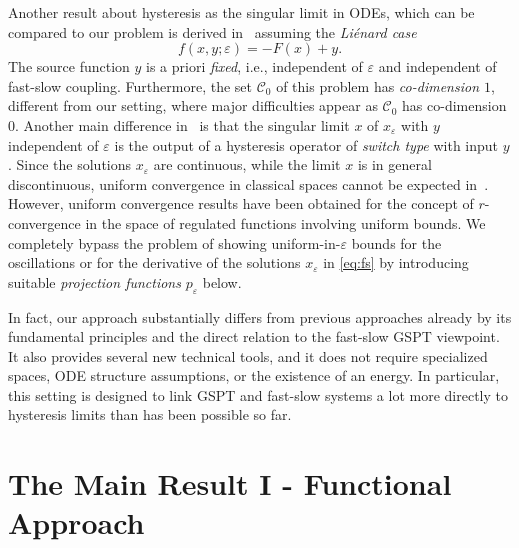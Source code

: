 \documentclass[12pt]{article}
\newcommand{\benn}{\begin{equation*}}
\newcommand{\eenn}{\end{equation*}}
\begin{document}
Another result about hysteresis as the singular limit in ODEs, which can be compared to 
our problem is derived in~\cite{Krejci2} assuming the 
\emph{Li\'enard case} 
\benn
f(x,y;\varepsilon)= -F(x)+y.
\eenn
The source function $y$ is a priori \emph{fixed}, i.e., independent of $\varepsilon$ 
and independent of fast-slow coupling. Furthermore, the set $\mathcal{C}_0$ of this 
problem has \emph{co-dimension $1$}, different from our setting, where major difficulties 
appear as $\mathcal{C}_0$ has co-dimension $0$. Another main difference in~\cite{Krejci2} 
is that the singular limit $x$ of $x_\varepsilon$ with $y$ independent of $\varepsilon$ is the 
output of a hysteresis operator of \emph{switch type} with input $y$. Since the solutions 
$x_\varepsilon$ are continuous, while the limit $x$ is in general discontinuous, uniform 
convergence in classical spaces cannot be expected 
in~\cite{Krejci2}. However, uniform
convergence results have been obtained for the concept of $r$-convergence in the space of 
regulated functions involving uniform bounds. We completely bypass the problem of showing 
uniform-in-$\varepsilon$ bounds for the oscillations or for the derivative of the 
solutions $x_\varepsilon$ in \eqref{eq:fs} by introducing suitable \emph{projection functions} 
$p_\varepsilon$ below.\medskip

In fact, our approach substantially differs from previous approaches already by its fundamental
principles and the direct relation to the fast-slow GSPT viewpoint. It also provides several
new technical tools, and it does not require specialized spaces, ODE
structure assumptions, or the existence of an energy. In particular, this setting is designed to
link GSPT and fast-slow systems a lot more directly to hysteresis limits than has been 
possible so far.
	
\section{The Main Result I - Functional Approach}
\label{sec:main1}
\end{document}
